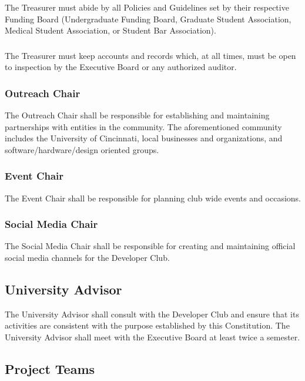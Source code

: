 \documentclass{article}
\newcommand{\clubName}{Developer Club\xspace}
\newcommand{\officersGroup}{Executive Board\xspace}
\let\section\subsection
\let\subsection\subsubsection
\begin{document}
\subsubsection{} The Treasurer must abide by all Policies and Guidelines set by their respective Funding Board (Undergraduate Funding Board, Graduate Student Association, Medical Student Association, or Student Bar Association).
\subsubsection{} The Treasurer must keep accounts and records which, at all times, must be open to inspection by the \officersGroup or any authorized auditor.

\subsection{Outreach Chair}
The Outreach Chair shall be responsible for establishing and maintaining partnerships with entities in the community. The aforementioned community includes the University of Cincinnati, local businesses and organizations, and software/hardware/design oriented groups.

\subsection{Event Chair}
The Event Chair shall be responsible for planning club wide events and occasions.

\subsection{Social Media Chair}
The Social Media Chair shall be responsible for creating and maintaining official social media channels for the \clubName.

\section{University Advisor}
The University Advisor shall consult with the \clubName and ensure that its activities are consistent with the purpose established by this Constitution. The University Advisor shall meet with the \officersGroup at least twice a semester.

\section{Project Teams}
\end{document}
